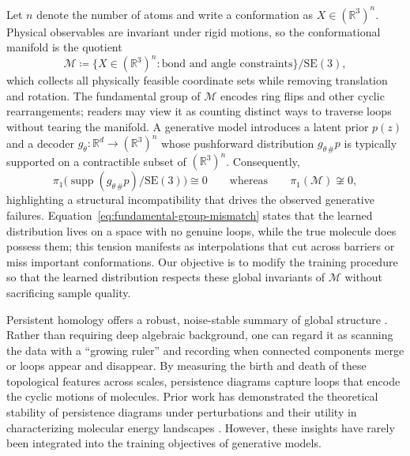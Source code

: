 \documentclass[11pt]{article}
\begin{document}
Let $n$ denote the number of atoms and write a conformation as $X \in (\mathbb{R}^3)^n$. Physical observables are invariant under rigid motions, so the conformational manifold is the quotient
\begin{equation}
    \mathcal{M} \coloneqq \big\{ X \in (\mathbb{R}^3)^n : \text{bond and angle constraints} \big\} / \mathrm{SE}(3),
    \label{eq:manifold}
\end{equation}
which collects all physically feasible coordinate sets while removing translation and rotation. The fundamental group of $\mathcal{M}$ encodes ring flips and other cyclic rearrangements; readers may view it as counting distinct ways to traverse loops without tearing the manifold. A generative model introduces a latent prior $p(z)$ and a decoder $g_\theta : \mathbb{R}^d \to (\mathbb{R}^3)^n$ whose pushforward distribution $g_{\theta\,\#}p$ is typically supported on a contractible subset of $(\mathbb{R}^3)^n$. Consequently,
\begin{equation}
    \pi_1\big( \operatorname{supp}(g_{\theta\,\#}p) / \mathrm{SE}(3) \big) \cong 0 \qquad \text{whereas} \qquad \pi_1(\mathcal{M}) \not\cong 0,
    \label{eq:fundamental-group-mismatch}
\end{equation}
highlighting a structural incompatibility that drives the observed generative failures. Equation~\eqref{eq:fundamental-group-mismatch} states that the learned distribution lives on a space with no genuine loops, while the true molecule does possess them; this tension manifests as interpolations that cut across barriers or miss important conformations. Our objective is to modify the training procedure so that the learned distribution respects these global invariants of $\mathcal{M}$ without sacrificing sample quality.

Persistent homology offers a robust, noise-stable summary of global structure \cite{edelsbrunner2010computational, carlsson2009topology}. Rather than requiring deep algebraic background, one can regard it as scanning the data with a ``growing ruler'' and recording when connected components merge or loops appear and disappear. By measuring the birth and death of these topological features across scales, persistence diagrams capture loops that encode the cyclic motions of molecules. Prior work has demonstrated the theoretical stability of persistence diagrams under perturbations \cite{cohen2007stability} and their utility in characterizing molecular energy landscapes \cite{carlsson2009topology, sommers2023tda}. However, these insights have rarely been integrated into the training objectives of generative models.
\end{document}
